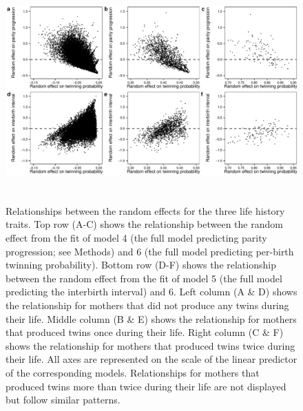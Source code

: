 \documentclass[a4paper]{article}\usepackage[]{graphicx}\usepackage[]{color}
\begin{document}
\begin{figure}[H]
\begin{center}
\includegraphics[height = 8.5cm]{../figures/figS2.pdf}
\end{center}
\caption{Relationships between the random effects for the three life history traits.
Top row (A-C) shows the relationship between the random effect from the fit of model 4 (the full model predicting parity progression; see Methods) and 6 (the full model predicting per-birth twinning probability). Bottom row (D-F) shows the relationship between the random effect from the fit of model 5 (the full model predicting the interbirth interval) and 6. Left column (A \& D) shows the relationship for mothers that did not produce any twins during their life. Middle column (B \& E) shows the relationship for mothers that produced twins once during their life. Right column (C \& F) shows the relationship for mothers that produced twins twice during their life. All axes are represented on the scale of the linear predictor of the corresponding models. Relationships for mothers that produced twins more than twice during their life are not displayed but follow similar patterns.}
\end{figure}
\end{document}
